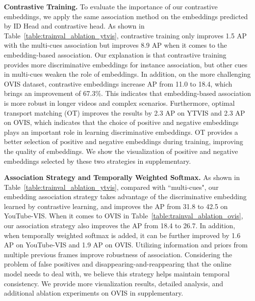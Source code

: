 \documentclass[runningheads]{llncs}
\begin{document}
\noindent\textbf{Contrastive Training.}
To evaluate the importance of our contrastive embeddings, we apply the same association method on the embeddings predicted by ID Head and contrastive head. As shown in Table~\ref{table:trainval_ablation_ytvis}, contrastive training only improves 1.5 AP with the multi-cues association but improves 8.9 AP when it comes to the embedding-based association.
Our explanation is that contrastive training provides more discriminative embeddings for instance association, but other cues in multi-cues weaken the role of embeddings. 
In addition, on the more challenging OVIS dataset, contrastive embeddings increase AP from 11.0 to 18.4, which brings an improvement of 67.3\%.
This indicates that embedding-based association is more robust in longer videos and complex scenarios.
Furthermore, optimal transport matching (OT) improves the results by 2.3 AP on YTVIS and 2.3 AP on OVIS, which indicates that the choice of positive and negative embeddings plays an important role in learning discriminative embeddings. OT provides a better selection of positive and negative embeddings during training, improving the quality of embeddings. We show the visualization of positive and negative embeddings selected by these two strategies in supplementary.









\noindent\textbf{Association Strategy and Temporally Weighted Softmax.}
As shown in Table~\ref{table:trainval_ablation_ytvis}, compared with ``multi-cues", our embedding association strategy takes advantage of the discriminative embedding learned by contrastive learning, and improves the AP from 31.8 to 42.5 on YouTube-VIS. 
When it comes to OVIS in Table~\ref{table:trainval_ablation_ovis}, our association strategy also improves the AP from 18.4 to 26.7.
In addition, when temporally weighted softmax is added, it can be further improved by 1.6 AP on YouTube-VIS and 1.9 AP on OVIS. Utilizing information and priors from multiple previous frames improve robustness of association. Considering the problem of false positives and disappearing-and-reappearing that the online model needs to deal with, we believe this strategy helps maintain temporal consistency. We provide more visualization results, detailed analysis, and additional ablation experiments on OVIS in supplementary.
\end{document}
